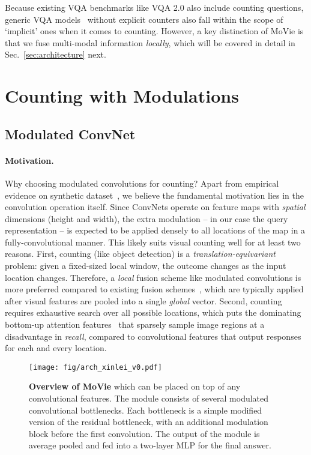 \documentclass{article} \usepackage[dvipsnames,table]{xcolor}
\newcommand{\ours}[0]{MoVie\xspace}
\begin{document}
Because existing VQA benchmarks like VQA 2.0 also include counting questions, generic VQA models~\cite{fukui2016multimodal,yu2019deep} without explicit counters also fall within the scope of `implicit' ones when it comes to counting. However, a key distinction of \ours is that we fuse multi-modal information \emph{locally}, which will be covered in detail in Sec.~\ref{sec:architecture} next.

\section{Counting with Modulations\label{sec:approach}}

\subsection{Modulated ConvNet\label{sec:architecture}}

\paragraph{Motivation.} Why choosing modulated convolutions for counting? Apart from empirical evidence on synthetic dataset~\cite{perez2018film}, we believe the fundamental motivation lies in the convolution operation itself. Since ConvNets operate on feature maps with \emph{spatial} dimensions (height and width), the extra modulation -- in our case the query representation -- is expected to be applied densely to all locations of the map in a fully-convolutional manner. This likely suits visual counting well for at least two reasons. First, counting (like object detection) is a \emph{translation-equivariant} problem: given a fixed-sized local window, the outcome changes as the input location changes. Therefore, a \emph{local} fusion scheme like modulated convolutions is more preferred compared to existing fusion schemes~\cite{fukui2016multimodal,yu2017multi}, which are typically applied after visual features are pooled into a single \emph{global} vector. Second, counting requires exhaustive search over all possible locations, which puts the dominating bottom-up attention features~\cite{anderson2018bottom} that sparsely sample image regions at a disadvantage in \emph{recall}, compared to convolutional features that output responses for each and every location.  

\begin{figure}[t]
\centering
\texttt{[image: fig/arch\_xinlei\_v0.pdf]}
\caption{\label{fig:architecture}\textbf{Overview of \ours} which can be placed on top of any convolutional features. The module consists of several modulated convolutional bottlenecks. Each bottleneck is a simple modified version of the residual bottleneck, with an additional modulation block before the first convolution. The output of the module is average pooled and fed into a two-layer MLP for the final answer.}
\end{figure}
\end{document}
